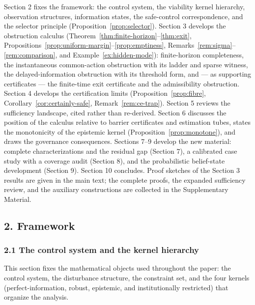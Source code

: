 \documentclass[10pt,twocolumn]{article}
\theoremstyle{definition}
\begin{document}
Section 2 fixes the framework: the control system, the viability kernel
hierarchy, observation structures, information states, the safe-control
correspondence, and the selector principle (Proposition~\ref{prop:selector}). Section 3 develops the obstruction calculus (Theorem~\ref{thm:finite-horizon}--\ref{thm:exit}, Propositions~\ref{prop:uniform-margin}--\ref{prop:emptiness}, Remarks~\ref{rem:sigma}--\ref{rem:comparison}, and Example~\ref{ex:hidden-mode}): finite-horizon completeness, the instantaneous common-action obstruction with its ladder and sparse witness, the delayed-information obstruction with its threshold form, and --- as supporting certificates --- the finite-time exit certificate and the admissibility obstruction. Section 4 develops the certification limits
(Proposition~\ref{prop:fibre}, Corollary~\ref{cor:certainly-safe}, Remark~\ref{rem:ce-trap}). Section 5 reviews the sufficiency landscape, cited rather than re-derived. Section
6 discusses the position of the calculus relative to barrier
certificates and estimation tubes, states the monotonicity of the
epistemic kernel (Proposition~\ref{prop:monotone}), and draws the governance
consequences. Sections 7--9 develop the new material: complete characterizations and the residual gap (Section 7), a calibrated case study with a coverage audit (Section 8), and the probabilistic belief-state development (Section 9). Section 10 concludes. Proof sketches of the Section 3 results are given in the main text; the complete proofs, the expanded sufficiency review, and the auxiliary constructions are collected in the Supplementary Material.



\subsection{2. Framework}\label{framework}

\subsubsection{2.1 The control system and the kernel
hierarchy}\label{the-control-system-and-the-kernel-hierarchy}

This section fixes the mathematical objects used throughout the paper:
the control system, the disturbance structure, the constraint set, and
the four kernels (perfect-information, robust, epistemic, and
institutionally restricted) that organize the analysis.
\end{document}
